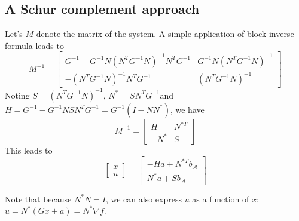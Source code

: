 \documentclass[11pt,a4paper]{article}
\newcommand{\BIN}{\begin{bmatrix}}
\newcommand{\BOUT}{\end{bmatrix}}
\newcommand{\act}{\mathcal{A}}
\begin{document}
\subsection{A Schur complement approach}
Let's $M$ denote the matrix of the system. A simple application of block-inverse formula leads to
\begin{equation}
M^{-1} = \BIN G^{-1} - G^{-1} N (N^T G^{-1} N)^{-1} N^T G^{-1} & G^{-1} N (N^T G^{-1} N)^{-1} \\ - (N^T G^{-1} N)^{-1} N^T G^{-1} & (N^T G^{-1} N)^{-1} \BOUT
\end{equation}
Noting $S = (N^T G^{-1} N)^{-1}$, $N^* = S N^T G^{-1}$\newline and $H = G^{-1} - G^{-1} N S N^T G^{-1} = G^{-1}(I-N N^*)$, we have
\begin{equation}
M^{-1} = \BIN H & N^{*T} \\ - N^* & S \BOUT
\end{equation}
This leads to 
\begin{equation}
	\BIN x \\ u \BOUT = \BIN -H a + N^{*T} b_\act \\ N^* a + S b_\act\BOUT \label{eq:primalDualSol}
\end{equation}

Note that because $N^* N = I$, we can also express $u$ as a function of $x$: $u = N^* (Gx+a) = N^* \nabla f$.
\end{document}
